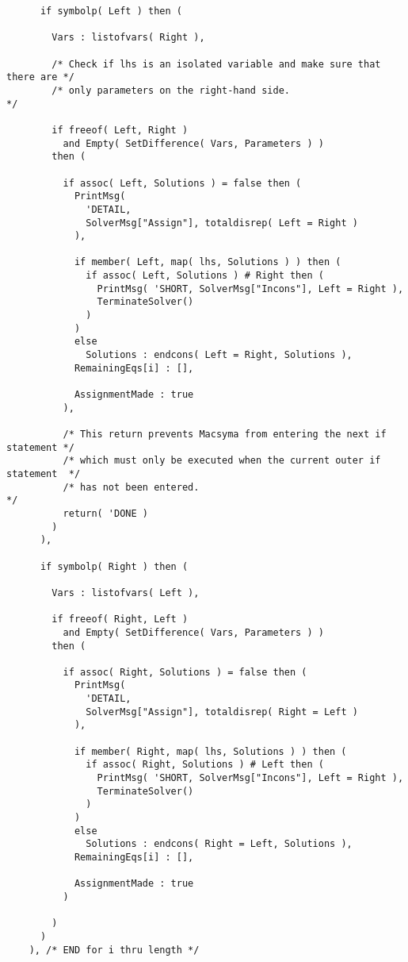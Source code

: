 \begin{verbatim}
      if symbolp( Left ) then (

        Vars : listofvars( Right ),

        /* Check if lhs is an isolated variable and make sure that there are */
        /* only parameters on the right-hand side.                           */

        if freeof( Left, Right )
          and Empty( SetDifference( Vars, Parameters ) )
        then (

          if assoc( Left, Solutions ) = false then (
            PrintMsg(
              'DETAIL,
              SolverMsg["Assign"], totaldisrep( Left = Right )
            ),

            if member( Left, map( lhs, Solutions ) ) then (
              if assoc( Left, Solutions ) # Right then (
                PrintMsg( 'SHORT, SolverMsg["Incons"], Left = Right ),
                TerminateSolver()
              )
            )
            else
              Solutions : endcons( Left = Right, Solutions ),
            RemainingEqs[i] : [],

            AssignmentMade : true
          ),

          /* This return prevents Macsyma from entering the next if statement */
          /* which must only be executed when the current outer if statement  */
          /* has not been entered.                                            */
          return( 'DONE )
        )
      ),

      if symbolp( Right ) then (

        Vars : listofvars( Left ),

        if freeof( Right, Left )
          and Empty( SetDifference( Vars, Parameters ) )
        then (
        
          if assoc( Right, Solutions ) = false then (
            PrintMsg(
              'DETAIL,
              SolverMsg["Assign"], totaldisrep( Right = Left )
            ),
          
            if member( Right, map( lhs, Solutions ) ) then (
              if assoc( Right, Solutions ) # Left then (
                PrintMsg( 'SHORT, SolverMsg["Incons"], Left = Right ),
                TerminateSolver()
              )
            )
            else
              Solutions : endcons( Right = Left, Solutions ),
            RemainingEqs[i] : [],

            AssignmentMade : true
          )
          
        )
      )
    ), /* END for i thru length */


\end{verbatim}
